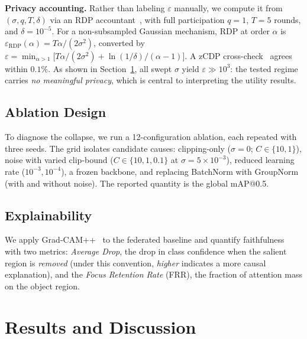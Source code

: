 \documentclass[conference]{IEEEtran}
\begin{document}
\textbf{Privacy accounting.} Rather than labeling $\varepsilon$ manually, we
compute it from $(\sigma,q,T,\delta)$ via an RDP accountant~\cite{mironov2017renyi},
with full participation $q{=}1$, $T{=}5$ rounds, and $\delta{=}10^{-5}$. For a
non-subsampled Gaussian mechanism, RDP at order $\alpha$ is
$\varepsilon_{\mathrm{RDP}}(\alpha)=T\alpha/(2\sigma^2)$, converted by
$\varepsilon=\min_{\alpha>1}\big[T\alpha/(2\sigma^2)+\ln(1/\delta)/(\alpha-1)\big]$.
A zCDP cross-check~\cite{bun2016concentrated} agrees within $0.1\%$. As shown in
Section~\ref{sec:results}, all swept $\sigma$ yield $\varepsilon\gg 10^{3}$:
the tested regime carries \emph{no meaningful privacy}, which is central to
interpreting the utility results.

\subsection{Ablation Design}
To diagnose the collapse, we run a 12-configuration ablation, each repeated
with three seeds. The grid isolates candidate causes:
clipping-only ($\sigma{=}0$; $C{\in}\{10,1\}$), noise with varied clip-bound
($C{\in}\{10,1,0.1\}$ at $\sigma{=}5{\times}10^{-3}$), reduced learning rate
($10^{-3},10^{-4}$), a frozen backbone, and replacing BatchNorm with GroupNorm
(with and without noise). The reported quantity is the global mAP@0.5.

\subsection{Explainability}
We apply Grad-CAM++~\cite{chattopadhay2018gradcampp} to the federated baseline
and quantify faithfulness with two metrics: \emph{Average Drop}, the drop in
class confidence when the salient region is \emph{removed} (under this
convention, \emph{higher} indicates a more causal explanation), and the
\emph{Focus Retention Rate} (FRR), the fraction of attention mass on the object
region.

\section{Results and Discussion}
\label{sec:results}
\end{document}
